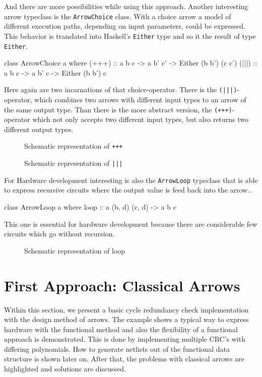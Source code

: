 \documentclass[9pt,final,a4paper,leqno]{article}
\newcommand{\xfig}[4][0.9] {%
    \begin{figure}[ht]
        \begin{center}
            \graphicspath{{./}{Images/}}
            \scalebox{#1}{%
                
            }
            \caption{\label{#4} #3}
        \end{center}
    \end{figure}
}
\newcommand{\hs}[1]{\mbox{\lstinline[basicstyle=\color{textgray}]!#1!}}
\begin{document}
\par
And there are more possibilities while using this approach. Another interesting arrow typeclass is the \hs{ArrowChoice} class. With a choice
arrow a model of different execution paths, depending on input parameters, could be expressed. This behavior is translated into Haskell's
\hs{Either} type and so it the result of type \hs{Either}. 

\begin{haskell}[]
class ArrowChoice a where
  (+++) :: a b c -> a b' c' -> Either (b b') (c c')
  (|||) :: a b c -> a b' c  -> Either (b b')  c 
\end{haskell}

Here again are two incarnations of that choice-operator. There is the \hs{(|||)}-operator, which combines two arrows with different input
types to an arrow of the same output type. Than there is the more abstract version, the \hs{(+++)}-operator which not only accepts two
different input types, but also returns two different output types.  

\xfig[.8]{ArrowPlPlPl}{Schematic representation of \hs{+++}}{figure:plplpl}
\xfig[.8]{ArrowPiPiPi}{Schematic representation of \hs{|||}}{figure:pipipi}

\par
For Hardware development interesting is also the \hs{ArrowLoop} typeclass that is able to express recursive circuits where the output value
is feed back into the arrow..
\begin{haskell}[]
class ArrowLoop a where
  loop :: a (b, d) (c, d) -> a b c
\end{haskell}

This one is essential for hardware development because there are considerable few circuits which go without recursion. 

\xfig[.8]{ArrowLp}{Schematic representation of loop}{figure:loop}


\section{First Approach: Classical Arrows}
Within this section, we present a basic cycle redundancy check implementation with the design method of arrows. The example shows a typical
way to express hardware with the functional method and also the flexibility of a functional approach is demonstrated. This is done by
implementing multiple CRC's with differing polynomials. How to generate netlists out of the functional data structure is shown later on.
After that, the problems with classical arrows are highlighted and solutions are discussed.
\end{document}
